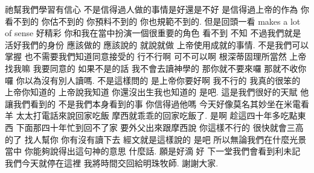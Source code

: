 \documentclass{book}
\begin{document}
祂幫我們學習有信心 不是信得過人做的事情是好還是不好 是信得過上帝的作為 你看不到的 你估不到的 你預料不到的 你也規範不到的.
但是回頭一看 makes a lot of sense 好精彩 你和我在當中扮演一個很重要的角色 看不到 不知 不過我們就是活好我們的身份 應該做的 應該說的 就說就做 上帝使用成就的事情.
不是我們可以掌握 也不需要我們知道同意接受的 行不行啊 可不可以啊 根深蒂固理所當然 上帝找我嘛 我要同意的 如果不是的話 我不會去讀神學的 那你就不要來囉 那就不收你囉 你以為沒有別人讀嗎.
不是這樣問的 是上帝你要好啊 我不行的 我真的很笨的 上帝你知道的 上帝說我知道 你還沒出生我也知道的 是吧.
這是我們很好的天賦 他讓我們看到的 不是我們本身看到的事 你信得過他嗎 今天好像莫名其妙坐在米電看羊 太太打電話來說回家吃飯 摩西就乖乖的回家吃飯了.
是啊 趁這四十年多吃點東西 下面那四十年忙到回不了家 要外父出來跟摩西說 你這樣不行的 很快就會三高的了 找人幫你 你有沒有讀下去 經文就是這樣說的 是吧 所以無論我們在什麼光景當中 你能夠說得出這句神的意思 什麼話.
願是好滴 好 下一堂我們會看到利未記 我們今天就停在這裡 我將時間交回給明珠牧師.
謝謝大家.
\newpage
\end{document}
